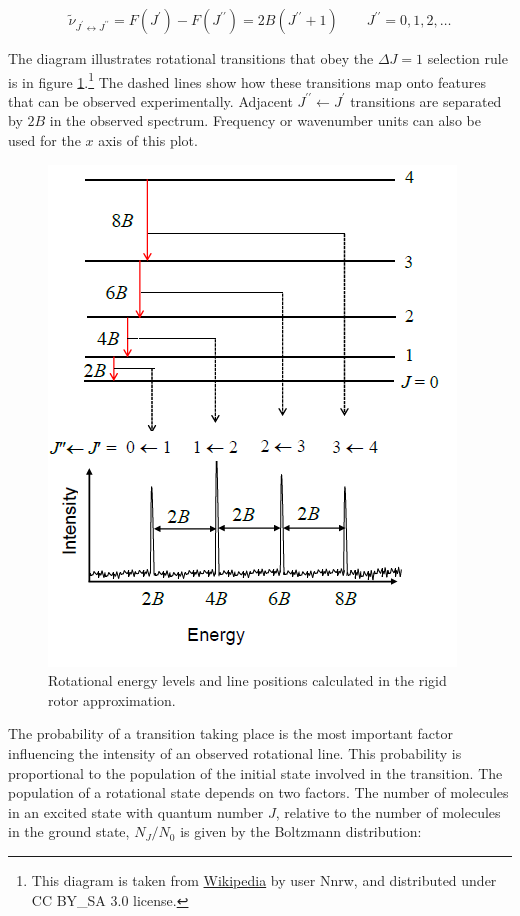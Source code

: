 \documentclass[
  9pt,
]{extbook}
\theoremstyle{definition}
\theoremstyle{definition}
\theoremstyle{definition}
\theoremstyle{remark}
\begin{document}
\begin{equation}
{\tilde  \nu }_{{J^{{\prime }}\leftrightarrow J^{{\prime \prime }}}}=F\left(J^{{\prime }}\right)-F\left(J^{{\prime \prime }}\right)=2B\left(J^{{\prime \prime }}+1\right)\qquad J^{{\prime \prime }}=0,1,2,\ldots
\label{eq:rot5}
\end{equation}

The diagram illustrates rotational transitions that obey the \(\Delta J=1\) selection rule is in figure \ref{fig:Fig1c13}.\footnote{This diagram is taken from \href{https://en.wikipedia.org/wiki/Rotational_spectroscopy\#/media/File:Rotational_spectrum_example.png}{Wikipedia} by user Nnrw, and distributed under CC BY\_SA 3.0 license.} The dashed lines show how these transitions map onto features that can be observed experimentally. Adjacent \(J^{{\prime \prime}}{\leftarrow}J^{{\prime }}\) transitions are separated by \(2B\) in the observed spectrum. Frequency or wavenumber units can also be used for the \(x\) axis of this plot.

\begin{figure}

{\centering \includegraphics[width=0.5\linewidth]{./img/OEP_wiki5} 

}

\caption{Rotational energy levels and line positions calculated in the rigid rotor approximation.}\label{fig:Fig1c13}
\end{figure}

The probability of a transition taking place is the most important factor influencing the intensity of an observed rotational line. This probability is proportional to the population of the initial state involved in the transition. The population of a rotational state depends on two factors. The number of molecules in an excited state with quantum number \(J\), relative to the number of molecules in the ground state, \(N_J/N_0\) is given by the Boltzmann distribution:
\end{document}
